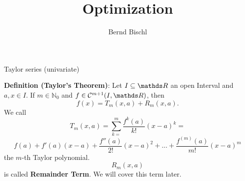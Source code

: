





\newcommand{\titlefigure}{figure_man/hinge_vs_l2.pdf}
\newcommand{\learninggoals}{
\item Taylor series (Univariate)
\item Hessian Matrix
\item Taylor series (Multivariate)}



\title{Optimization}
\author{Bernd Bischl}
\date{}



\sloppy
   
\begin{vbframe}{Taylor series (univariate)}

    \textbf{Definition (Taylor's Theorem)}: Let $I \subseteq \R$ an open Interval and $a, x \in I$. If $m \in \mathbb{N}_0$ and $f \in \mathcal{C}^{m+1}(I,\R)$, then
    $$f(x) = T_{m}(x,a) + R_{m}(x,a).$$
    We call
    $$T_{m}(x,a) = \sum_{k=}^{m} \frac{f^{k}(a)}{k!}(x-a)^{k} = $$
    $$f(a) + f'(a)(x-a) + \frac{f''(a)}{2!}(x-a)^{2} + ... + \frac{f^{(m)}(a)}{m!}(x-a)^{m}$$ the $m$-th Taylor polynomial.
    $$R_{m}(x,a)$$ is called \textbf{Remainder Term}. We will cover this term later.    
\end{vbframe}

